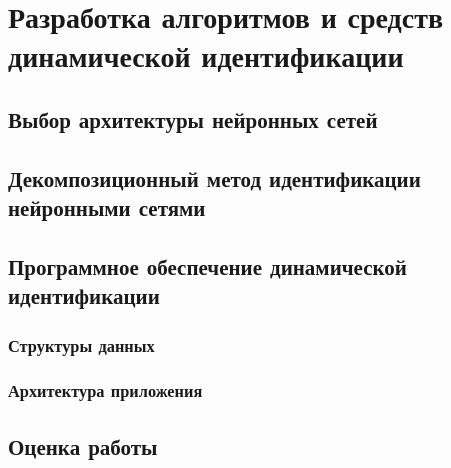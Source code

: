 \chapter{Разработка алгоритмов и средств динамической идентификации}

\section{Выбор архитектуры нейронных сетей}

\section{Декомпозиционный метод идентификации нейронными сетями}

\section{Программное обеспечение динамической идентификации}

\subsection{Структуры данных}

\subsection{Архитектура приложения}

\section{Оценка работы}

